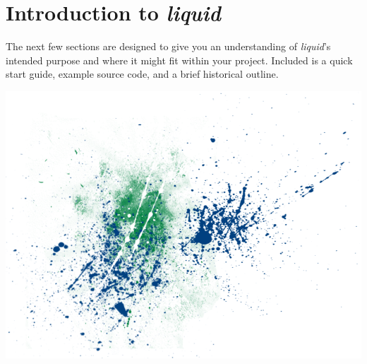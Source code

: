 \documentclass[11pt,twoside]{article}
\newcommand{\liquid}{{\it liquid}}
\begin{document}

\pagestyle{headings}

%
%

\newpage
\part{Introduction to \liquid }
\label{part:intro}

\bigskip
\noindent
The next few sections are designed to give you an understanding of
\liquid's intended purpose and where it might fit within your project.
Included is a quick start guide, example source code, and a brief
historical outline.

\vfill

\includegraphics[width=\textwidth]{graphics/liquid_splatter_01.png}

\vfill





%
%
\newpage
\end{document}
